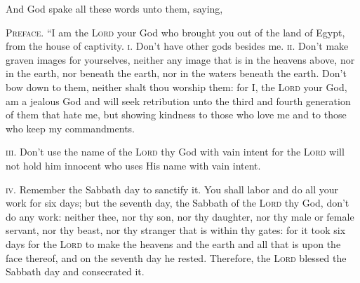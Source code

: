 
\begin{inparaenum}
     And God spake all these words unto them, saying,%
    
     \textsc{Preface.} ``I am the \textsc{Lord} your God who brought you out of the land of Egypt, from the house of captivity.%
     \textsc{i.} Don't have other gods besides me.%
     \textsc{ii.} Don't make graven images for yourselves, neither any image that is in the heavens above, nor in the earth, nor beneath the earth, nor in the waters beneath the earth.%
     Don't bow down to them, neither shalt thou worship them: for I, the \textsc{Lord} your God, am a jealous God and will seek retribution unto the third and fourth generation of them that hate me,%
     but showing kindness to those who love me and to those who keep my commandments.%
    
     \textsc{iii.} Don't use the name of the \textsc{Lord} thy God with vain intent for the \textsc{Lord} will not hold him innocent who uses His name with vain intent.%
    
     \textsc{iv.} Remember the Sabbath day to sanctify it.%
     You shall labor and do all your work for six days;%
     but the seventh day, the Sabbath of the \textsc{Lord} thy God, don't do any work: neither thee, nor thy son, nor thy daughter, nor thy male or female servant, nor thy beast, nor thy stranger that is within thy gates:%
     for it took six days for the \textsc{Lord} to make the heavens and the earth and all that is upon the face thereof, and on the seventh day he rested. Therefore, the \textsc{Lord} blessed the Sabbath day and consecrated it.%
    

\end{inparaenum}
